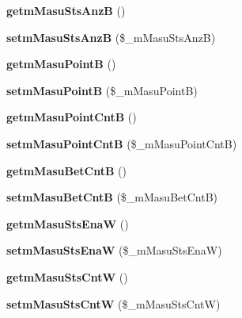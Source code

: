 \begin{DoxyCompactItemize}
{\bfseries getm\+Masu\+Sts\+AnzB} ()
\item 
\mbox{\label{class_reversi_ab95634419bbdec6708972b4364a1f7b4}} 
{\bfseries setm\+Masu\+Sts\+AnzB} (\$\+\_\+m\+Masu\+Sts\+AnzB)
\item 
\mbox{\label{class_reversi_a6d5b9c28b3a92e01b42ed862985d2f98}} 
{\bfseries getm\+Masu\+PointB} ()
\item 
\mbox{\label{class_reversi_ae4fa18aa71c2e6d5c2faed6719bff776}} 
{\bfseries setm\+Masu\+PointB} (\$\+\_\+m\+Masu\+PointB)
\item 
\mbox{\label{class_reversi_ae75baf790b7d8b4892f6a2e0f0eb8e67}} 
{\bfseries getm\+Masu\+Point\+CntB} ()
\item 
\mbox{\label{class_reversi_a78f0479c5fa03a015ac9ec6492e05c4f}} 
{\bfseries setm\+Masu\+Point\+CntB} (\$\+\_\+m\+Masu\+Point\+CntB)
\item 
\mbox{\label{class_reversi_aa0883ee24e29449c6bb89d161521ed67}} 
{\bfseries getm\+Masu\+Bet\+CntB} ()
\item 
\mbox{\label{class_reversi_a6243772dbdb1bbe38c01f908457d5743}} 
{\bfseries setm\+Masu\+Bet\+CntB} (\$\+\_\+m\+Masu\+Bet\+CntB)
\item 
\mbox{\label{class_reversi_aefef308965d0fe90daf393d4b0a04184}} 
{\bfseries getm\+Masu\+Sts\+EnaW} ()
\item 
\mbox{\label{class_reversi_a230f00edf5b575f24a7094d18123fe4a}} 
{\bfseries setm\+Masu\+Sts\+EnaW} (\$\+\_\+m\+Masu\+Sts\+EnaW)
\item 
\mbox{\label{class_reversi_a04067fac0467af0e096cb3115fa804f4}} 
{\bfseries getm\+Masu\+Sts\+CntW} ()
\item 
\mbox{\label{class_reversi_a112112f495910acedc8ec201fa669ae3}} 
{\bfseries setm\+Masu\+Sts\+CntW} (\$\+\_\+m\+Masu\+Sts\+CntW)
\item 
\mbox{\label{class_reversi_a51598ce2b9166a720cf2f9de321c00eb}} 

\end{DoxyCompactItemize}
